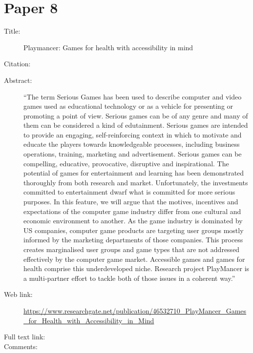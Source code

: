 \documentclass{scrartcl}
\begin{document}
\section*{Paper 8}
\begin{description}
\item[Title:] Playmancer: Games for health with accessibility in mind
\item[Citation:] \cite{Kala}
\item[Abstract:] ``The term Serious Games has been used to describe computer and video games used as educational technology or as a vehicle for presenting or promoting a point of view. Serious games can be of any genre and many of them can be considered a kind of edutainment. Serious games are intended to provide an engaging, self-reinforcing context in which to motivate and educate the players towards knowledgeable processes, including business operations, training, marketing and advertisement. Serious games can be compelling, educative, provocative, disruptive and inspirational. The potential of games for entertainment and learning has been demonstrated thoroughly from both research and market. Unfortunately, the investments committed to entertainment dwarf what is committed for more serious purposes. In this feature, we will argue that the motives, incentives and expectations of the computer game industry differ from one cultural and economic environment to another. As the game industry is dominated by US companies, computer game products are targeting user groups mostly informed by the marketing departments of those companies. This process creates marginalised user groups and game types that are not addressed effectively by the computer game market. Accessible games and games for health comprise this underdeveloped niche. Research project PlayMancer is a multi-partner effort to tackle both of those issues in a coherent way.''
\item[Web link:] \url {https://www.researchgate.net/publication/46532710_PlayMancer_Games_for_Health_with_Accessibility_in_Mind}
\item[Full text link:] 
\item[Comments:] 
\end{description}
\end{document}
